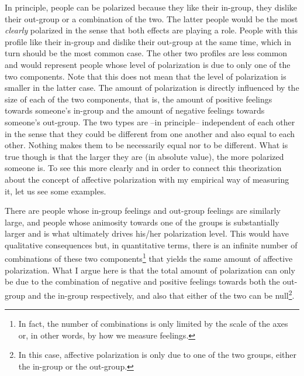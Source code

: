 \documentclass[a4paper, svgnames]{article}
\begin{document}
In principle, people can be polarized because they like their in-group, they dislike their out-group or a combination of the two. The latter people would be the most \textit{clearly} polarized in the sense that both effects are playing a role. People with this profile like their in-group and dislike their out-group at the same time, which in turn should be the most common case. The other two profiles are less common and would represent people whose level of polarization is due to only one of the two components. Note that this does not mean that the level of polarization is smaller in the latter case. The amount of polarization is directly influenced by the size of each of the two components, that is, the amount of positive feelings towards someone's in-group and the amount of negative feelings towards someone's out-group. The two types are --in principle-- independent of each other in the sense that they could be different from one another and also equal to each other. Nothing makes them to be necessarily equal nor to be different. What is true though is that the larger they are (in absolute value), the more polarized someone is. To see this more clearly and in order to connect this theorization about the concept of affective polarization with my empirical way of measuring it, let us see some examples.

There are people whose in-group feelings and out-group feelings are similarly large, and people whose animosity towards one of the groups is substantially larger and is what ultimately drives his/her polarization level. This would have qualitative consequences but, in quantitative terms, there is an infinite number of combinations of these two components\footnote{In fact, the number of combinations is only limited by the scale of the axes or, in other words, by how we measure feelings.} that yields the same amount of affective polarization. What I argue here is that the total amount of polarization can only be due to the combination of negative and positive feelings towards both the out-group and the in-group respectively, and also that either of the two can be null\footnote{In this case, affective polarization is only due to one of the two groups, either the in-group or the out-group.}.
\end{document}
